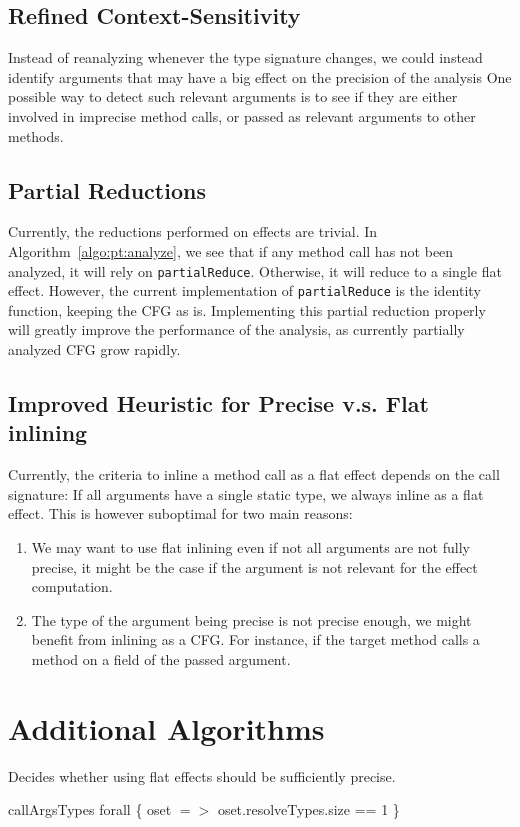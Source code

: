 \documentclass[a4paper]{article}
\begin{document}
\subsection{Refined Context-Sensitivity}
Instead of reanalyzing whenever the type signature changes, we could instead
identify arguments that may have a big effect on the precision of the analysis
One possible way to detect such relevant arguments is to see if they are either
involved in imprecise method calls, or passed as relevant arguments to other
methods.

\subsection{Partial Reductions}
Currently, the reductions performed on effects are trivial. In
Algorithm~\ref{algo:pt:analyze}, we see that if any method call has not been
analyzed, it will rely on \verb=partialReduce=. Otherwise, it will reduce to a
single flat effect. However, the current implementation of \verb=partialReduce=
is the identity function, keeping the CFG as is. Implementing this partial
reduction properly will greatly improve the performance of the analysis, as
currently partially analyzed CFG grow rapidly.

\subsection{Improved Heuristic for Precise v.s. Flat inlining}
Currently, the criteria to inline a method call as a flat effect depends on the
call signature: If all arguments have a single static type, we always inline as
a flat effect. This is however suboptimal for two main reasons:
\begin{enumerate}
    \item We may want to use flat inlining even if not all arguments are not fully
precise, it might be the case if the argument is not relevant for the effect
computation.
    \item The type of the argument being precise is not precise enough, we might
benefit from inlining as a CFG. For instance, if the target method calls a
method on a field of the passed argument.
\end{enumerate}

\newpage
\appendix
\section{Additional Algorithms}

\begin{algorithm}
\caption{Decides whether using flat effects should be sufficiently
precise.}\label{algo:pt:shouldwe}
\begin{algorithmic}[1]
    \State \Return callArgsTypes forall \{ oset $=>$ oset.resolveTypes.size == 1 \}
\EndFunction
\end{algorithmic}
\end{algorithm}
\end{document}
